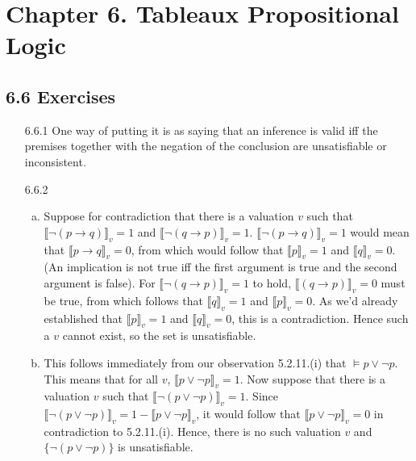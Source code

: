 \chapter{Chapter 6. Tableaux Propositional Logic}

%
%	
%		
%
\section*{6.6 Exercises}

\begin{enumerate}

	\item[6.6.1] One way of putting it is as saying that an inference is valid iff the premises together with the negation of the conclusion are unsatisfiable or inconsistent.

	\item[6.6.2]
	
	\begin{enumerate}[(a)]
	
		\item Suppose for contradiction that there is a valuation $v$ such that $\llbracket \neg (p\rightarrow q)\rrbracket_v =1$ and $\llbracket \neg (q \rightarrow p)\rrbracket_v =1$. $\llbracket \neg (p\rightarrow q)\rrbracket_v =1$ would mean that $\llbracket p\rightarrow q\rrbracket_v =0$, from which would follow that $\llbracket p\rrbracket_v =1$ and $\llbracket q\rrbracket_v =0$. (An implication is not true iff the first argument is true and the second argument is false). For $\llbracket \neg (q \rightarrow p)\rrbracket_v =1$ to hold, $\llbracket (q \rightarrow p)\rrbracket_v =0$ must be true, from which follows that $\llbracket q\rrbracket_v =1$ and $\llbracket p\rrbracket_v =0$. As we'd already established that $\llbracket p\rrbracket_v =1$ and $\llbracket q\rrbracket_v =0$, this is a contradiction. Hence such a $v$ cannot exist, so the set is unsatisfiable.
		
		\item This follows immediately from our observation 5.2.11.(i) that $\vDash p\lor\neg p$. This means that for all $v$, $\llbracket p\lor\neg p\rrbracket_v=1$. Now suppose that there is a valuation $v$ such that $\llbracket \neg (p\lor\neg p)\rrbracket_v=1$. Since $\llbracket \neg (p\lor\neg p)\rrbracket_v=1-\llbracket p\lor\neg p\rrbracket_v$, it would follow that $\llbracket p\lor\neg p\rrbracket_v=0$ in contradiction to 5.2.11.(i). Hence, there is no such valuation $v$ and $\{\neg(p\lor\neg p)\}$ is unsatisfiable.
		

\end{enumerate}
\end{enumerate}
